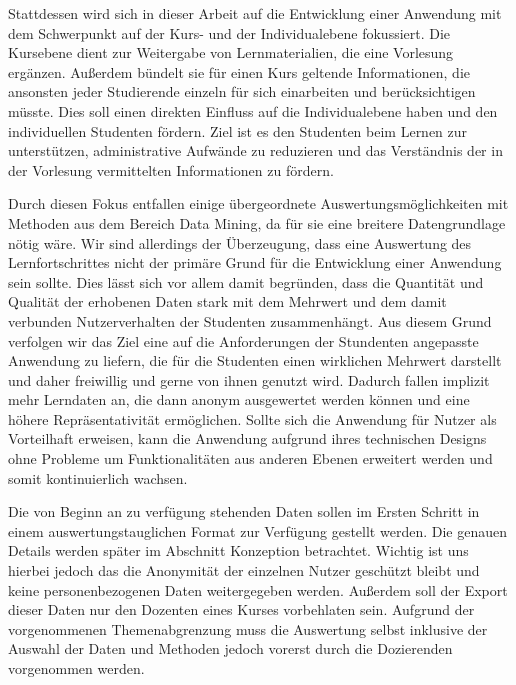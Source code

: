 Stattdessen wird sich in dieser Arbeit auf die Entwicklung einer Anwendung mit dem Schwerpunkt auf der Kurs- und der Individualebene fokussiert.
Die Kursebene dient zur Weitergabe von Lernmaterialien, die eine Vorlesung ergänzen. Außerdem bündelt sie für einen Kurs geltende Informationen, die ansonsten jeder Studierende einzeln für sich einarbeiten und berücksichtigen müsste. Dies soll einen direkten Einfluss auf die Individualebene haben und den individuellen Studenten fördern. Ziel ist es den Studenten beim Lernen zur unterstützen, administrative Aufwände zu reduzieren und das Verständnis der in der Vorlesung vermittelten Informationen zu fördern.  

Durch diesen Fokus entfallen einige übergeordnete Auswertungsmöglichkeiten mit Methoden aus dem Bereich Data Mining, da für sie eine breitere Datengrundlage nötig wäre. Wir sind allerdings der Überzeugung, dass eine Auswertung des Lernfortschrittes nicht der primäre Grund für die Entwicklung einer Anwendung sein sollte. Dies lässt sich vor allem damit begründen, dass die Quantität und Qualität der erhobenen Daten stark mit dem Mehrwert und dem damit verbunden Nutzerverhalten der Studenten zusammenhängt. Aus diesem Grund verfolgen wir das Ziel eine auf die Anforderungen der Stundenten angepasste Anwendung zu liefern, die für die Studenten einen wirklichen Mehrwert darstellt und daher freiwillig und gerne von ihnen genutzt wird. Dadurch fallen implizit mehr Lerndaten an, die dann anonym ausgewertet werden können und eine höhere Repräsentativität ermöglichen. Sollte sich die Anwendung für Nutzer als Vorteilhaft erweisen, kann die Anwendung aufgrund ihres technischen Designs ohne Probleme um Funktionalitäten aus anderen Ebenen erweitert werden und somit kontinuierlich wachsen.




Die von Beginn an zu verfügung stehenden Daten sollen im Ersten Schritt in einem auswertungstauglichen Format zur Verfügung gestellt werden. Die genauen Details werden später im Abschnitt Konzeption betrachtet. Wichtig ist uns hierbei jedoch das die Anonymität der einzelnen Nutzer geschützt bleibt und keine personenbezogenen Daten weitergegeben werden. Außerdem soll der Export dieser Daten nur den Dozenten eines Kurses vorbehlaten sein. Aufgrund der vorgenommenen Themenabgrenzung muss die Auswertung selbst inklusive der Auswahl der Daten und Methoden jedoch vorerst durch die Dozierenden vorgenommen werden. 

